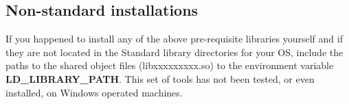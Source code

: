 \subsection{Non-standard installations}
If you happened to install any of the above pre-requisite libraries yourself and if they are not located in the Standard library directories for your OS, include the paths to the shared object files (libxxxxxxxxx.so) to the environment variable \textbf{LD\_LIBRARY\_PATH}. This set of tools has not been tested, or even installed, on Windows operated machines.


